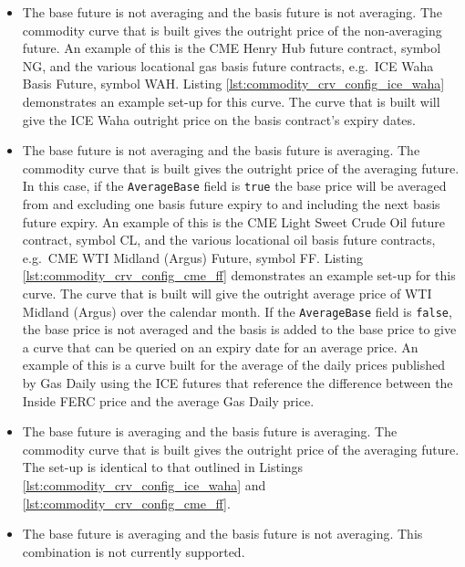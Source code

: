 \begin{itemize}
\item
The base future is not averaging and the basis future is not averaging. The commodity curve that is built gives the outright price of the non-averaging future. An example of this is the CME Henry Hub future contract, symbol NG, and the various locational gas basis future contracts, e.g.\ ICE Waha Basis Future, symbol WAH. Listing \ref{lst:commodity_crv_config_ice_waha} demonstrates an example set-up for this curve. The curve that is built will give the ICE Waha outright price on the basis contract's expiry dates.

\item
The base future is not averaging and the basis future is averaging. The commodity curve that is built gives the outright price of the averaging future. In this case, if the \lstinline!AverageBase! field is \lstinline!true! the base price will be averaged from and excluding one basis future expiry to and including the next basis future expiry. An example of this is the CME Light Sweet Crude Oil future contract, symbol CL, and the various locational oil basis future contracts, e.g.\ CME WTI Midland (Argus) Future, symbol FF. Listing \ref{lst:commodity_crv_config_cme_ff} demonstrates an example set-up for this curve. The curve that is built will give the outright average price of WTI Midland (Argus) over the calendar month. If the \lstinline!AverageBase! field is \lstinline!false!, the base price is not averaged and the basis is added to the base price to give a curve that can be queried on an expiry date for an average price. An example of this is a curve built for the average of the daily prices published by Gas Daily using the ICE futures that reference the difference between the Inside FERC price and the average Gas Daily price.

\item
The base future is averaging and the basis future is averaging. The commodity curve that is built gives the outright price of the averaging future. The set-up is identical to that outlined in Listings \ref{lst:commodity_crv_config_ice_waha} and \ref{lst:commodity_crv_config_cme_ff}.

\item
The base future is averaging and the basis future is not averaging. This combination is not currently supported.
\end{itemize}

